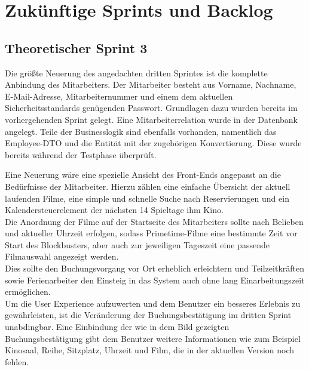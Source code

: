 \section{Zukünftige Sprints und Backlog}

\subsection{Theoretischer Sprint 3}
\label{ssec:theoretischer_sprint}
\multipleauthorsection{\authorRF}{\authorEJ}
Die größte Neuerung des angedachten dritten Sprintes ist die komplette Anbindung des Mitarbeiters.
Der Mitarbeiter besteht aus Vorname, Nachname, E-Mail-Adresse, Mitarbeiternummer und einem dem aktuellen Sicherheitsstandards genügenden Passwort.
Grundlagen dazu wurden bereits im vorhergehenden Sprint gelegt.
Eine Mitarbeiterrelation wurde in der Datenbank angelegt.
Teile der Businesslogik sind ebenfalls vorhanden, namentlich das Employee-\acs{DTO} und die Entität mit der zugehörigen Konvertierung.
Diese wurde bereits während der Testphase überprüft.

Eine Neuerung wäre eine spezielle Ansicht des Front-Ends angepasst an die Bedürfnisse der Mitarbeiter.
Hierzu zählen eine einfache Übersicht der aktuell laufenden Filme, eine simple und schnelle Suche nach Reservierungen und ein Kalendersteuerelement der nächsten 14 Spieltage ihm Kino. \\
Die Anordnung der Filme auf der Startseite des Mitarbeiters sollte nach Belieben und aktueller Uhrzeit erfolgen, sodass Primetime-Filme eine bestimmte Zeit vor Start des Blockbusters, aber auch zur jeweiligen Tageszeit eine passende Filmauswahl angezeigt werden. \\
Dies sollte den Buchungsvorgang vor Ort erheblich erleichtern und Teilzeitkräften sowie Ferienarbeiter den Einsteig in das System auch ohne lang Einarbeitungszeit ermöglichen. \\

Um die User Experience aufzuwerten und dem Benutzer ein besseres Erlebnis zu gewährleisten, ist die Veränderung der Buchungsbestätigung im dritten Sprint unabdingbar.
Eine Einbindung der wie in dem Bild gezeigten Buchungsbestätigung gibt dem Benutzer weitere Informationen wie zum Beispiel Kinosaal, Reihe, Sitzplatz, Uhrzeit und Film, die in der aktuellen Version noch fehlen.

